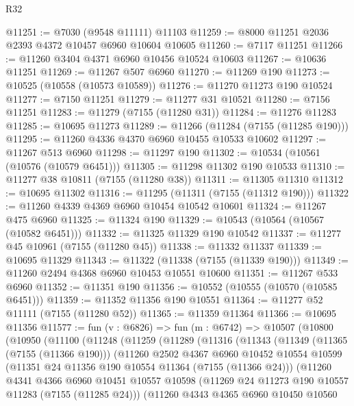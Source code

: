 \begin{lexlean}{R32}
\begin{coremodule}
@11251 := @7030 (@9548 @11111) @11103
@11259 := @8000 @11251 @2036 @2393 @4372 @10457 @6960 @10604 @10605
@11260 := @7117 @11251
@11266 := @11260 @3404 @4371 @6960 @10456 @10524 @10603
@11267 := @10636 @11251
@11269 := @11267 @507 @6960
@11270 := @11269 @190
@11273 := @10525 (@10558 (@10573 @10589))
@11276 := @11270 @11273 @190 @10524
@11277 := @7150 @11251
@11279 := @11277 @31 @10521
@11280 := @7156 @11251
@11283 := @11279 (@7155 (@11280 @31))
@11284 := @11276 @11283
@11285 := @10695 @11273
@11289 := @11266 (@11284 (@7155 (@11285 @190)))
@11295 := @11260 @4336 @4370 @6960 @10455 @10533 @10602
@11297 := @11267 @513 @6960
@11298 := @11297 @190
@11302 := @10534 (@10561 (@10576 (@10579 @6451)))
@11305 := @11298 @11302 @190 @10533
@11310 := @11277 @38 @10811 (@7155 (@11280 @38))
@11311 := @11305 @11310
@11312 := @10695 @11302
@11316 := @11295 (@11311 (@7155 (@11312 @190)))
@11322 := @11260 @4339 @4369 @6960 @10454 @10542 @10601
@11324 := @11267 @475 @6960
@11325 := @11324 @190
@11329 := @10543 (@10564 (@10567 (@10582 @6451)))
@11332 := @11325 @11329 @190 @10542
@11337 := @11277 @45 @10961 (@7155 (@11280 @45))
@11338 := @11332 @11337
@11339 := @10695 @11329
@11343 := @11322 (@11338 (@7155 (@11339 @190)))
@11349 := @11260 @2494 @4368 @6960 @10453 @10551 @10600
@11351 := @11267 @533 @6960
@11352 := @11351 @190
@11356 := @10552 (@10555 (@10570 (@10585 @6451)))
@11359 := @11352 @11356 @190 @10551
@11364 := @11277 @52 @11111 (@7155 (@11280 @52))
@11365 := @11359 @11364
@11366 := @10695 @11356
@11577 := fun (v : @6826) =>
  fun (m : @6742) =>
  @10507
    (@10800
      (@10950
        (@11100
          (@11248
            (@11259
              (@11289
                (@11316
                  (@11343
                    (@11349
                      (@11365 (@7155 (@11366 @190)))
                      (@11260
                        @2502
                        @4367
                        @6960
                        @10452
                        @10554
                        @10599
                        (@11351 @24 @11356 @190 @10554 @11364 (@7155 (@11366 @24)))
                        (@11260
                          @4341
                          @4366
                          @6960
                          @10451
                          @10557
                          @10598
                          (@11269 @24 @11273 @190 @10557 @11283 (@7155 (@11285 @24)))
                          (@11260
                            @4343
                            @4365
                            @6960
                            @10450
                            @10560

\end{coremodule}
\end{lexlean}
